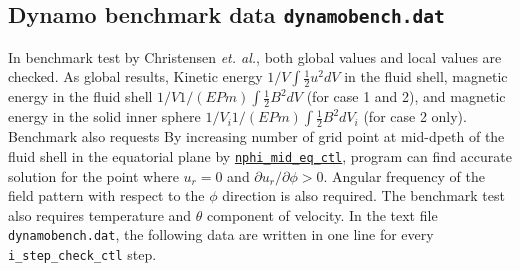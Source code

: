 \subsection{Dynamo benchmark data {\tt dynamobench.dat}}
 In benchmark test by Christensen {\it et. al.}, both global values and local values are checked. As global results, Kinetic energy $1/V \int \frac{1}{2} u^{2} dV$ in the fluid shell, magnetic energy in the fluid shell $1/V 1/(E Pm) \int \frac{1}{2} B^{2} dV$ (for case 1 and 2), and magnetic energy in the solid inner sphere $1/V_{i} 1/(E Pm) \int \frac{1}{2} B^{2} dV_{i}$ (for case 2 only). Benchmark also requests 
 By increasing number of grid point at mid-dpeth of the fluid shell in the equatorial plane by \hyperref[href_t:nphi_mid_eq_ctl]{{\tt nphi\_mid\_eq\_ctl}}, program can find accurate solution for the point where $u_{r} = 0$ and $\partial u_{r} / \partial \phi > 0$. Angular frequency of the field pattern with respect to the $\phi$ direction is also required. The benchmark test also requires temperature and $\theta$ component of velocity. In the text file {\tt dynamobench.dat}, the following data are written in one line for every {\tt i\_step\_check\_ctl} step.
%
